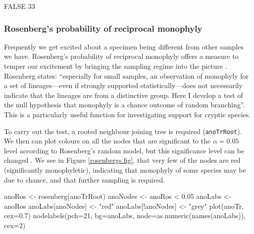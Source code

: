 \documentclass{article}
\newcommand{\fun}[1]{\texttt{#1}}
\begin{document}
\begin{Routput}
FALSE 
   33 
\end{Routput}

\subsubsection{Rosenberg's probability of reciprocal monophyly}
Frequently we get excited about a specimen being different from other samples we have. Rosenberg's probability of reciprocal monophyly offers a measure to temper our excitement by bringing the sampling regime into the picture \citep{Rosenberg2007}. Rosenberg states: ``especially for small samples, an observation of monophyly for a set of lineages---even if strongly supported statistically---does not necessarily indicate that the lineages are from a distinctive group. Here I develop a test of the null hypothesis that monophyly is a chance outcome of random branching''. This is a particularly useful function for investigating support for cryptic species.

To carry out the test, a rooted neighbour joining tree is required (\fun{anoTrRoot}). We then can plot colours on all the nodes that are significant to the $\alpha = 0.05$ level according to Rosenberg's random model, but this significance level can be changed \citep{Rosenberg2007}. We see in Figure \ref{rosenbergs.fig}, that very few of the nodes are red (significantly monophyletic), indicating that monophyly of some species may be due to chance, and that further sampling is required. 

\begin{console}
anoRos <- rosenberg(anoTrRoot)
anoNodes <- anoRos < 0.05
anoLabs <- anoRos
anoLabs[anoNodes] <- "red"
anoLabs[!anoNodes] <- "grey"
plot(anoTr, cex=0.7)
nodelabels(pch=21, bg=anoLabs, node=as.numeric(names(anoLabs)), cex=2)
\end{console}
\end{document}
